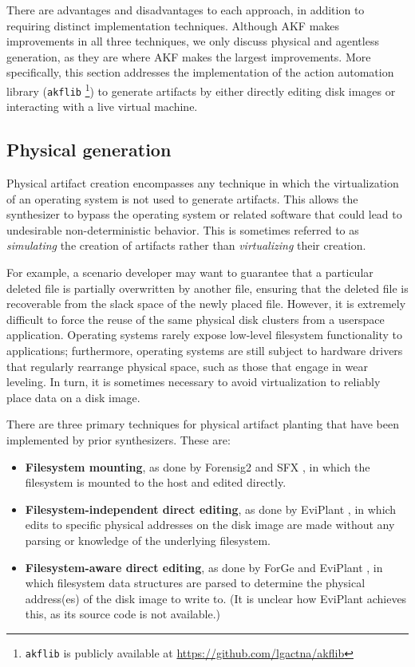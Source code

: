 \documentclass[final,5p,times,twocolumn]{elsarticle}
\newcommand{\passthrough}[1]{#1}
\begin{document}
There are advantages and disadvantages to each approach, in addition to
requiring distinct implementation techniques. Although AKF makes
improvements in all three techniques, we only discuss physical and
agentless generation, as they are where AKF makes the largest
improvements. More specifically, this section addresses the
implementation of the action automation library
(\passthrough{\lstinline!akflib!} \footnote{\passthrough{\lstinline!akflib!}
  is publicly available at \url{https://github.com/lgactna/akflib}}) to
generate artifacts by either directly editing disk images or interacting
with a live virtual machine.

\subsection{Physical generation}\label{physical-generation}

Physical artifact creation encompasses any technique in which the
virtualization of an operating system is not used to generate artifacts.
This allows the synthesizer to bypass the operating system or related
software that could lead to undesirable non-deterministic behavior. This
is sometimes referred to as \emph{simulating} the creation of artifacts
rather than \emph{virtualizing} their creation.

For example, a scenario developer may want to guarantee that a
particular deleted file is partially overwritten by another file,
ensuring that the deleted file is recoverable from the slack space of
the newly placed file. However, it is extremely difficult to force the
reuse of the same physical disk clusters from a userspace application.
Operating systems rarely expose low-level filesystem functionality to
applications; furthermore, operating systems are still subject to
hardware drivers that regularly rearrange physical space, such as those
that engage in wear leveling. In turn, it is sometimes necessary to
avoid virtualization to reliably place data on a disk image.

There are three primary techniques for physical artifact planting that
have been implemented by prior synthesizers. These are:

\begin{itemize}
\item
  \textbf{Filesystem mounting}, as done by Forensig2
  \cite{mochForensicImageGenerator2009} and SFX
  \cite{russellForensicImageDescription2012}, in which the
  filesystem is mounted to the host and edited directly.
\item
  \textbf{Filesystem-independent direct editing}, as done by EviPlant
  \cite{scanlonEviPlantEfficientDigital2017}, in which edits to
  specific physical addresses on the disk image are made without any
  parsing or knowledge of the underlying filesystem.
\item
  \textbf{Filesystem-aware direct editing}, as done by ForGe
  \cite{vistiAutomaticCreationComputer2015} and EviPlant
  \cite{scanlonEviPlantEfficientDigital2017}, in which filesystem
  data structures are parsed to determine the physical address(es) of
  the disk image to write to. (It is unclear how EviPlant achieves this,
  as its source code is not available.)
\end{itemize}
\end{document}
